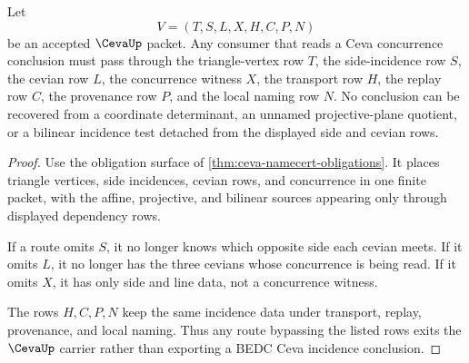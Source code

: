 \begin{theorem}
\label{thm:ceva-incidence-nonescape}
Let
$$
V=(T,S,L,X,H,C,P,N)
$$
be an accepted $\CevaUp$ packet. Any consumer that reads a Ceva concurrence conclusion must pass through the triangle-vertex row $T$, the side-incidence row $S$, the cevian row $L$, the concurrence witness $X$, the transport row $H$, the replay row $C$, the provenance row $P$, and the local naming row $N$. No conclusion can be recovered from a coordinate determinant, an unnamed projective-plane quotient, or a bilinear incidence test detached from the displayed side and cevian rows.
\end{theorem}
\begin{proof}
Use the obligation surface of \autoref{thm:ceva-namecert-obligations}. It places triangle vertices, side incidences, cevian rows, and concurrence in one finite packet, with the affine, projective, and bilinear sources appearing only through displayed dependency rows.

If a route omits $S$, it no longer knows which opposite side each cevian meets. If it omits $L$, it no longer has the three cevians whose concurrence is being read. If it omits $X$, it has only side and line data, not a concurrence witness.

The rows $H,C,P,N$ keep the same incidence data under transport, replay, provenance, and local naming. Thus any route bypassing the listed rows exits the $\CevaUp$ carrier rather than exporting a BEDC Ceva incidence conclusion.
\end{proof}




